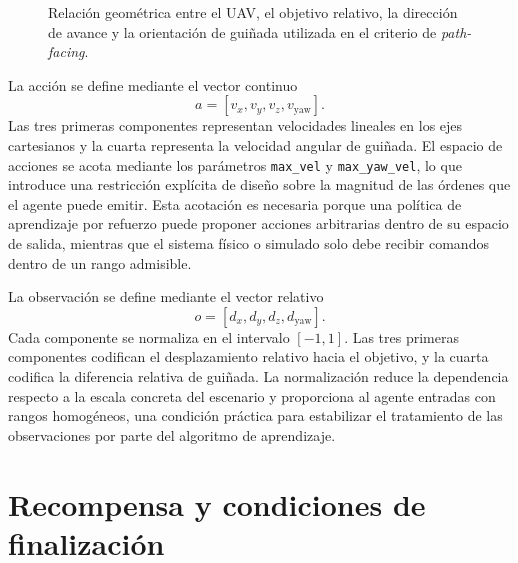 \begin{figure}[t]
\shorthandon{<>}
\caption{Relación geométrica entre el UAV, el objetivo relativo, la dirección de
avance y la orientación de guiñada utilizada en el criterio de
\emph{path-facing}.}
\label{fig:aplicacion:target_path_facing}
\end{figure}

La acción se define mediante el vector continuo
\[
    a = [v_x, v_y, v_z, v_{\mathrm{yaw}}].
\]
Las tres primeras componentes representan velocidades lineales en los ejes
cartesianos y la cuarta representa la velocidad angular de guiñada. El espacio de
acciones se acota mediante los parámetros \texttt{max\_vel} y
\texttt{max\_yaw\_vel}, lo que introduce una restricción explícita de diseño
sobre la magnitud de las órdenes que el agente puede emitir. Esta acotación es
necesaria porque una política de aprendizaje por refuerzo puede proponer acciones
arbitrarias dentro de su espacio de salida, mientras que el sistema físico o
simulado solo debe recibir comandos dentro de un rango admisible.

La observación se define mediante el vector relativo
\[
    o = [d_x, d_y, d_z, d_{\mathrm{yaw}}].
\]
Cada componente se normaliza en el intervalo $[-1, 1]$. Las tres primeras
componentes codifican el desplazamiento relativo hacia el objetivo, y la cuarta
codifica la diferencia relativa de guiñada. La normalización reduce la dependencia
respecto a la escala concreta del escenario y proporciona al agente entradas con
rangos homogéneos, una condición práctica para estabilizar el tratamiento de las
observaciones por parte del algoritmo de aprendizaje.

\section{Recompensa y condiciones de finalización} \label{sct:aplicacion:recompensa}

